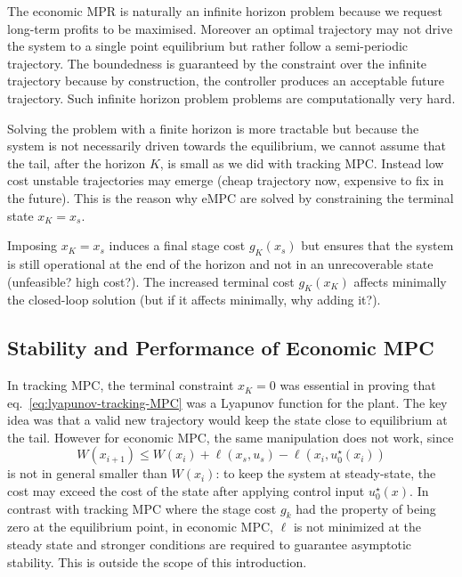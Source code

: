 \documentclass[11pt]{report}
\begin{document}
The economic MPR is naturally an infinite horizon problem because we request long-term profits to be maximised. Moreover an optimal trajectory may not drive the system to a single point equilibrium but rather follow a semi-periodic trajectory. The boundedness is guaranteed by the constraint over the infinite trajectory because by construction, the controller produces an acceptable future trajectory. Such infinite horizon problem problems are computationally very hard.

Solving the problem with a finite horizon is more tractable but because the system is not necessarily driven towards the equilibrium, we cannot assume that the tail, after the horizon $K$, is small as we did with tracking MPC. Instead low cost unstable trajectories may emerge (cheap trajectory now, expensive to fix in the future). This is the reason why eMPC are solved by constraining the terminal state $x_K=x_s$.

Imposing $x_K=x_s$ induces a final stage cost $g_K(x_s)$ but ensures that the system is still operational at the end of the horizon and not in an unrecoverable state (unfeasible? high cost?). The increased terminal cost $g_K(x_K)$ affects minimally the closed-loop solution (but if it affects minimally, why adding it?).

\subsection{Stability and Performance of Economic MPC}
\label{sec:stability-performance-economic-MPC}

In tracking MPC, the terminal constraint $x_K=0$ was essential in proving that eq.~\eqref{eq:lyapunov-tracking-MPC} was a Lyapunov function for the plant. The key idea was that a valid new trajectory would keep the state close to equilibrium at the tail. However for economic MPC, the same manipulation does not work, since
\begin{equation}
  \label{eq:eMPC-Lyapunov-like-inequality}
  W(x_{i+1}) \le W(x_i) + \ell(x_s,u_s) - \ell(x_i,u_0^\star(x_i))
\end{equation}
is not in general smaller than $W(x_i)$: to keep the system at steady-state, the cost may exceed the cost of the state after applying control input $u_0^\star(x)$. In contrast with tracking MPC where the stage cost $g_k$ had the property of being zero at the equilibrium point, in economic MPC, $\ell$ is not minimized at the steady state and stronger conditions are required to guarantee asymptotic stability. This is outside the scope of this introduction.
\end{document}
